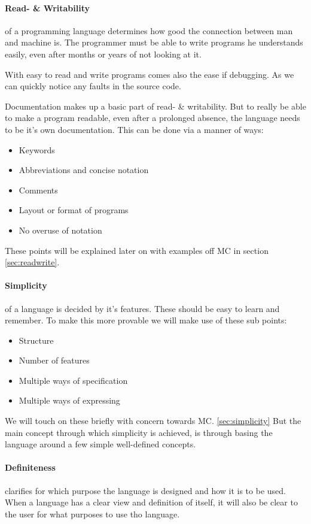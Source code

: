 \begin{multicols}{2}
   \paragraph{Read- \& Writability }
   of a programming language determines how good the connection between man and machine is.
   The programmer must be able to write programs he understands easily, even after months or years of not looking at it.

   With easy to read and write programs comes also the ease if debugging.
   As we can quickly notice any faults in the source code.

   Documentation makes up a basic part of read- \& writability.
   But to really be able to make a program readable, even after a prolonged absence, the language needs to be it's own documentation.
   This can be done via a manner of ways:
   \begin{itemize}
      \item Keywords
      \item Abbreviations and concise notation
      \item Comments
      \item Layout or format of programs
      \item No overuse of notation
   \end{itemize}
   These points will be explained later on with examples off MC in section \ref{sec:readwrite}.

   \paragraph{Simplicity}
   of a language is decided by it's features.
   These should be easy to learn and remember.
   To make this more provable we will make use of these sub points:
   \begin{itemize}
      \item Structure
      \item Number of features
      \item Multiple ways of specification
      \item Multiple ways of expressing
   \end{itemize}
   We will touch on these briefly with concern towards MC.
   \ref{sec:simplicity} But the main concept through which simplicity is achieved, is through basing the language around a few simple well-defined concepts.
   \cite{khedker1997makes}

   \paragraph{Definiteness}
   clarifies for which purpose the language is designed and how it is to be used.
   When a language has a clear view and definition of itself, it will also be clear to the user for what purposes to use tho language.


\end{multicols}
